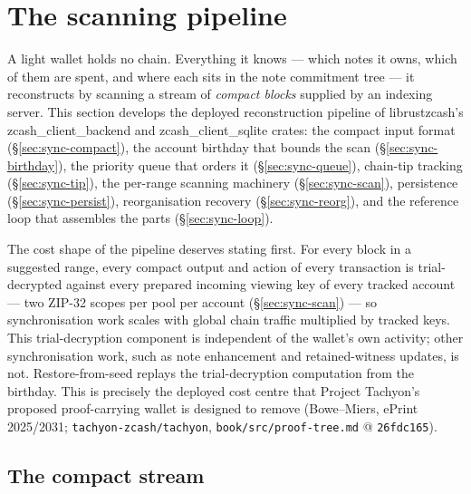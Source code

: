 \documentclass[11pt,a4paper]{article}
\theoremstyle{definition}
\begin{document}
\FloatBarrier

\section{The scanning pipeline}\label{sec:sync-scanning}

A light wallet holds no chain. Everything it knows --- which notes it owns,
which of them are spent, and where each sits in the note commitment tree ---
it reconstructs by scanning a stream of \emph{compact blocks} supplied by an
indexing server. This section develops the deployed reconstruction pipeline
of \textsf{librustzcash}'s \textsf{zcash\_client\_backend} and
\textsf{zcash\_client\_sqlite} crates: the compact input format
(\S\ref{sec:sync-compact}), the account birthday that bounds the scan
(\S\ref{sec:sync-birthday}), the priority queue that orders it
(\S\ref{sec:sync-queue}), chain-tip tracking (\S\ref{sec:sync-tip}), the
per-range scanning machinery (\S\ref{sec:sync-scan}), persistence
(\S\ref{sec:sync-persist}), reorganisation recovery
(\S\ref{sec:sync-reorg}), and the reference loop that assembles the parts
(\S\ref{sec:sync-loop}).

The cost shape of the pipeline deserves stating first. For every block in a
suggested range, every compact output and action of every transaction is
trial-decrypted against every prepared incoming viewing key of every tracked
account --- two ZIP-32 scopes per pool per account
(\S\ref{sec:sync-scan}) --- so synchronisation work scales with global chain
traffic multiplied by tracked keys. This trial-decryption component is
independent of the wallet's own activity; other synchronisation work, such
as note enhancement and retained-witness updates, is not. Restore-from-seed
replays the trial-decryption computation from the birthday.
This is precisely the deployed cost centre that Project Tachyon's proposed
proof-carrying wallet is designed to remove (Bowe--Miers, ePrint 2025/2031;
\texttt{tachyon-zcash/tachyon}, \texttt{book/src/proof-tree.md} @
\texttt{26fdc165}).

\subsection{The compact stream}\label{sec:sync-scan-stream}
\end{document}
